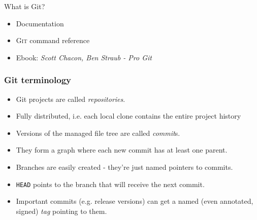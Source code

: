 \documentclass[compress,aspectratio=169]{beamer}
\begin{document}
\begin{frame}{What is Git?}
\begin{minipage}[t]{0.7\linewidth}
\begin{itemize}
\begin{itemize}
                  \item Documentation
                  \item \textsc{Git} command reference
                  \item<4> Ebook: \textit{Scott Chacon, Ben Straub - Pro Git}
              \end{itemize}
      \end{itemize}
  \end{minipage}
\end{frame}
\begin{frame}
  \frametitle{Git terminology}
  \begin{itemize}
    \item Git projects are called \textit{repositories}.
    \item Fully distributed, i.e. each local clone contains the entire project history
    \item Versions of the managed file tree are called \textit{commit}s.
    \item They form a graph where each new commit has at least one parent.
    \item Branches are easily created - they're just named pointers to commits.
    \item \texttt{HEAD} points to the branch that will receive the next commit.
    \item Important commits (e.g. release versions) can get a named (even annotated, signed) \textit{tag} pointing to them.
  \end{itemize}
\end{frame}
\end{document}
